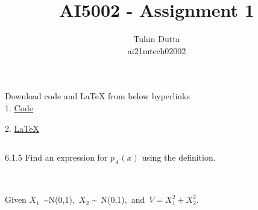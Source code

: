 \documentclass[journal,12pt,twocolumn]{IEEEtran}
\begin{document}
\providecommand{\mtx}[1]{\mathbf{#1}}
\providecommand{\fourier}{\overset{\mathcal{F}}{ \rightleftharpoons}}
\providecommand{\system}{\overset{\mathcal{H}}{ \longleftrightarrow}}
\newcommand{\solution}{\noindent \textbf{Solution: }}
\newcommand{\cosec}{\,\text{cosec}\,}
\providecommand{\dec}[2]{\ensuremath{\overset{#1}{\underset{#2}{\gtrless}}}}
\newcommand{\myvec}[1]{\ensuremath{\begin{pmatrix}#1\end{pmatrix}}}
\newcommand{\mydet}[1]{\ensuremath{\begin{vmatrix}#1\end{vmatrix}}}
\makeatletter
{}
\makeatother
\let\StandardTheFigure\thefigure
\let\vec\mathbf
\renewcommand{\thefigure}{\theproblem}
\def\putbox#1#2#3{\makebox[0in][l]{\makebox[#1][l]{}\raisebox{\baselineskip}[0in][0in]{\raisebox{#2}[0in][0in]{#3}}}}
     \def\rightbox#1{\makebox[0in][r]{#1}}
     \def\centbox#1{\makebox[0in]{#1}}
     \def\topbox#1{\raisebox{-\baselineskip}[0in][0in]{#1}}
     \def\midbox#1{\raisebox{-0.5\baselineskip}[0in][0in]{#1}}
\vspace{3cm}
\title{AI5002 - Assignment 1}
\author{Tuhin Dutta\\ ai21mtech02002}
\maketitle
\newpage
\bigskip
\renewcommand{\thefigure}{\theenumi}
\renewcommand{\thetable}{\theenumi}
\begin{mdframed}
Download code and LaTeX from below hyperlinks\\
1. \href{https://github.com/Tauhait/AI5002/Assignment-1/Code}{Code}


2. \href{https://github.com/Tauhait/AI5002/Assignment-1/LaTeX}{LaTeX}
\end{mdframed}
\subsection*{}

6.1.5 Find an expression for $p_A(x)$ using the definition.\\

\subsection*{}\\
Given $X_1$\ \sim N(0,1),\ $X_2$ \sim\ N(0,1),\ and\ $V = X_1^2 + X_2^2$.\\
\end{document}
